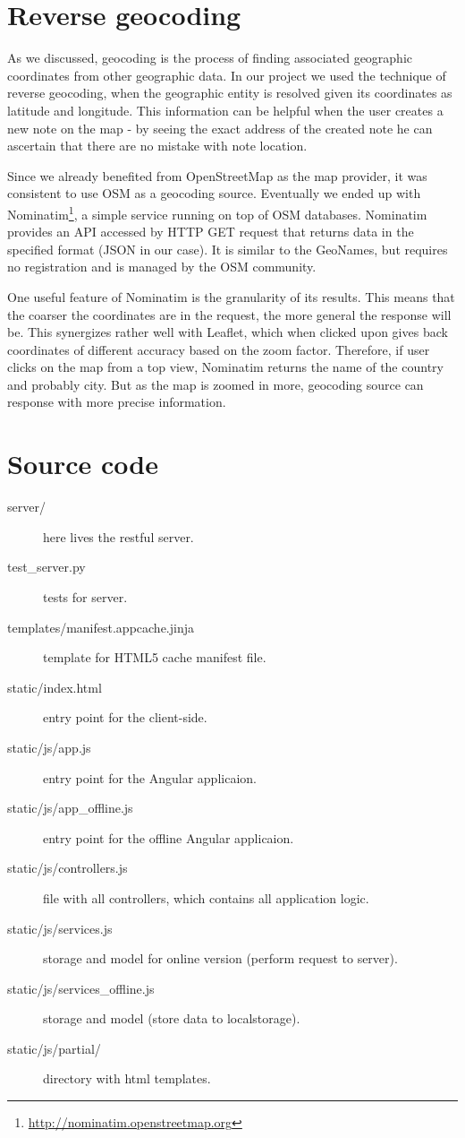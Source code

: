 \documentclass[12pt,a4paper]{article}
\begin{document}
\section{Reverse geocoding}

As we discussed, geocoding is the process of finding associated geographic coordinates
from other geographic data. In our project we used the technique of
reverse geocoding, when the geographic entity is resolved given its
coordinates as latitude and longitude. This information can be helpful
when the user creates a new note on the map - by seeing the exact
address of the created note he can ascertain that there are no mistake
with note location.

Since we already benefited from OpenStreetMap as the map provider, it was
consistent to use OSM as a geocoding source. Eventually we ended up
with Nominatim\footnote{\url{http://nominatim.openstreetmap.org}}, a simple
service running on top of OSM databases. Nominatim provides an API
accessed by HTTP GET request that returns data in the specified format
(JSON in our case). It is similar to the GeoNames, but requires no registration
and is managed by the OSM community.

One useful feature of Nominatim is the granularity of its results.
This means that the coarser the coordinates are in the request, the
more general the response will be. This synergizes rather well with
Leaflet, which when clicked upon gives back coordinates of different
accuracy based on the zoom factor. Therefore, if user clicks on the
map from a top view, Nominatim returns the name of the country and
probably city. But as the map is zoomed in more, geocoding source can
response with more precise information.

\section{Source code}
    \begin{description}
        \item[server/] here lives the restful server.
        \item[test\_server.py] tests for server.
        \item[templates/manifest.appcache.jinja] template for HTML5 cache manifest file.
        \item[static/index.html] entry point for the client-side.
        \item[static/js/app.js] entry point for the Angular applicaion.
        \item[static/js/app\_offline.js] entry point for the offline Angular applicaion.
        \item[static/js/controllers.js] file with all controllers, which contains all application logic.
        \item[static/js/services.js] storage and model for online version (perform request to server).
        \item[static/js/services\_offline.js] storage and model (store data to localstorage).
        \item[static/js/partial/] directory with html templates.
    \end{description}
\end{document}
